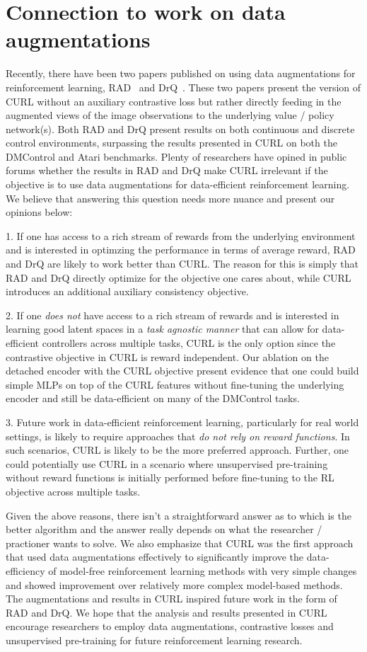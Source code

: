 \section{Connection to work on data augmentations}

Recently, there have been two papers published on using data augmentations for reinforcement learning, RAD~\cite{laskin2020reinforcement} and DrQ~\cite{kostrikov2020image}. These two papers present the version of CURL without an auxiliary contrastive loss but rather directly feeding in the augmented views of the image observations to the underlying value / policy network(s). Both RAD and DrQ present results on both continuous and discrete control environments, surpassing the results presented in CURL on both the DMControl and Atari benchmarks. Plenty of researchers have opined in public forums whether the results in RAD and DrQ make CURL irrelevant if the objective is to use data augmentations for data-efficient reinforcement learning. We believe that answering this question needs more nuance and present our opinions below:

1. If one has access to a rich stream of rewards from the underlying environment and is interested in optimzing the performance in terms of average reward, RAD and DrQ are likely to work better than CURL. The reason for this is simply that RAD and DrQ directly optimize for the objective one cares about, while CURL introduces an additional auxiliary consistency objective.

2. If one {\it does not} have access to a rich stream of rewards and is interested in learning good latent spaces in a {\it task agnostic manner} that can allow for data-efficient controllers across multiple tasks, CURL is the only option since the contrastive objective in CURL is reward independent. Our ablation on the detached encoder with the CURL objective present evidence that one could build simple MLPs on top of the CURL features without fine-tuning the underlying encoder and still be data-efficient on many of the DMControl tasks.

3. Future work in data-efficient reinforcement learning, particularly for real world settings, is likely to require approaches that {\it do not rely on reward functions}. In such scenarios, CURL is likely to be the more preferred approach. Further, one could potentially use CURL in a scenario where unsupervised pre-training without reward functions is initially performed before fine-tuning to the RL objective across multiple tasks.

Given the above reasons, there isn't a straightforward answer as to which is the better algorithm and the answer really depends on what the researcher / practioner wants to solve. We also emphasize that CURL was the first approach that used data augmentations effectively to significantly improve the data-efficiency of model-free reinforcement learning methods with very simple changes and showed improvement over relatively more complex model-based methods. The augmentations and results in CURL inspired future work in the form of RAD and DrQ. We hope that the analysis and results presented in CURL encourage researchers to employ data augmentations, contrastive losses and unsupervised pre-training for future reinforcement learning research.